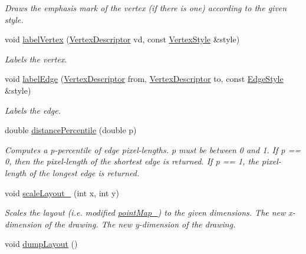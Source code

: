 \begin{DoxyCompactItemize}
\begin{DoxyCompactList}\small\item\em Draws the emphasis mark of the vertex (if there is one) according to the given style. \end{DoxyCompactList}\item 
void \hyperlink{structslb_1_1core_1_1ui_1_1Drawer_a0f55c8f860997d54043f4ec9b3dc9e34}{label\+Vertex} (\hyperlink{structslb_1_1core_1_1ui_1_1Drawer_a3106bd6b1354ea4a24c3ef169c1e18b8}{Vertex\+Descriptor} vd, const \hyperlink{structslb_1_1core_1_1ui_1_1VertexStyle}{Vertex\+Style} \&style)
\begin{DoxyCompactList}\small\item\em Labels the vertex. \end{DoxyCompactList}\item 
void \hyperlink{structslb_1_1core_1_1ui_1_1Drawer_af4549706b49ae5134b017a42e34edfa5}{label\+Edge} (\hyperlink{structslb_1_1core_1_1ui_1_1Drawer_a3106bd6b1354ea4a24c3ef169c1e18b8}{Vertex\+Descriptor} from, \hyperlink{structslb_1_1core_1_1ui_1_1Drawer_a3106bd6b1354ea4a24c3ef169c1e18b8}{Vertex\+Descriptor} to, const \hyperlink{structslb_1_1core_1_1ui_1_1EdgeStyle}{Edge\+Style} \&style)
\begin{DoxyCompactList}\small\item\em Labels the edge. \end{DoxyCompactList}\item 
double \hyperlink{structslb_1_1core_1_1ui_1_1Drawer_a0c85b4e405d6caaaa660b361517c9196}{distance\+Percentile} (double p)
\begin{DoxyCompactList}\small\item\em Computes a p-\/percentile of edge pixel-\/lengths. p must be between 0 and 1. If p == 0, then the pixel-\/length of the shortest edge is returned. If p == 1, the pixel-\/length of the longest edge is returned. \end{DoxyCompactList}\item 
void \hyperlink{structslb_1_1core_1_1ui_1_1Drawer_a51558414e4dc38d3e879d2ed38b97f1d}{scale\+Layout\+\_\+} (int x, int y)\hypertarget{structslb_1_1core_1_1ui_1_1Drawer_a51558414e4dc38d3e879d2ed38b97f1d}{}\label{structslb_1_1core_1_1ui_1_1Drawer_a51558414e4dc38d3e879d2ed38b97f1d}

\begin{DoxyCompactList}\small\item\em Scales the layout (i.\+e. modified \hyperlink{structslb_1_1core_1_1ui_1_1Drawer_a3744c0f39a867c7a09cc079b775e22a3}{point\+Map\+\_\+}) to the given dimensions. The new x-\/dimension of the drawing. The new y-\/dimension of the drawing. \end{DoxyCompactList}\item 
void \hyperlink{structslb_1_1core_1_1ui_1_1Drawer_ae87b616f678ecb0fc818c8002d338881}{dump\+Layout} ()\hypertarget{structslb_1_1core_1_1ui_1_1Drawer_ae87b616f678ecb0fc818c8002d338881}{}\label{structslb_1_1core_1_1ui_1_1Drawer_ae87b616f678ecb0fc818c8002d338881}


\end{DoxyCompactItemize}
